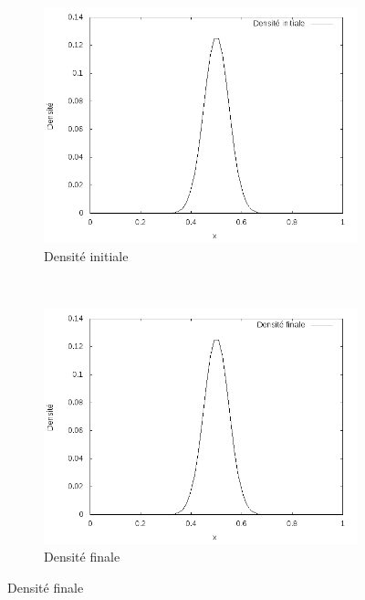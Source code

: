 \documentclass[a4paper,12pt]{article}
\begin{document}
\begin{figure}[!h]
\centering 
	\begin{subfigure}[b]{0.48\linewidth}
	\includegraphics[width=\textwidth]{img/1DObstacle/f0.png}
	\caption{Densité initiale}
	\end{subfigure}
	~
	\begin{subfigure}[b]{0.48\linewidth}
	\includegraphics[width=\textwidth]{img/1DObstacle/f1.png}
	\caption{Densité finale}
	\end{subfigure}
	

\end{figure}
\end{document}

